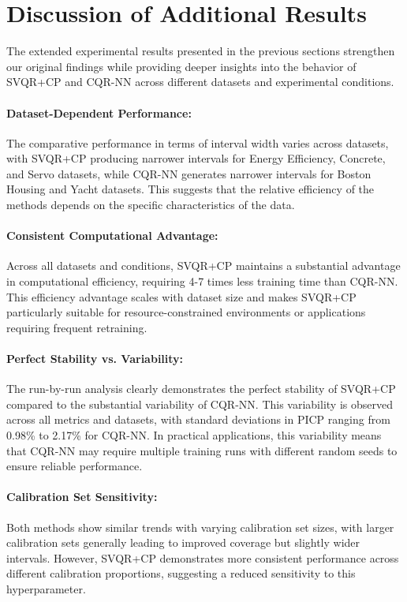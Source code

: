 \documentclass{article}
\begin{document}
\section{Discussion of Additional Results}

The extended experimental results presented in the previous sections strengthen our original findings while providing deeper insights into the behavior of SVQR+CP and CQR-NN across different datasets and experimental conditions.

\paragraph{Dataset-Dependent Performance:} The comparative performance in terms of interval width varies across datasets, with SVQR+CP producing narrower intervals for Energy Efficiency, Concrete, and Servo datasets, while CQR-NN generates narrower intervals for Boston Housing and Yacht datasets. This suggests that the relative efficiency of the methods depends on the specific characteristics of the data.

\paragraph{Consistent Computational Advantage:} Across all datasets and conditions, SVQR+CP maintains a substantial advantage in computational efficiency, requiring 4-7 times less training time than CQR-NN. This efficiency advantage scales with dataset size and makes SVQR+CP particularly suitable for resource-constrained environments or applications requiring frequent retraining.

\paragraph{Perfect Stability vs. Variability:} The run-by-run analysis clearly demonstrates the perfect stability of SVQR+CP compared to the substantial variability of CQR-NN. This variability is observed across all metrics and datasets, with standard deviations in PICP ranging from 0.98\% to 2.17\% for CQR-NN. In practical applications, this variability means that CQR-NN may require multiple training runs with different random seeds to ensure reliable performance.

\paragraph{Calibration Set Sensitivity:} Both methods show similar trends with varying calibration set sizes, with larger calibration sets generally leading to improved coverage but slightly wider intervals. However, SVQR+CP demonstrates more consistent performance across different calibration proportions, suggesting a reduced sensitivity to this hyperparameter.
\end{document}
